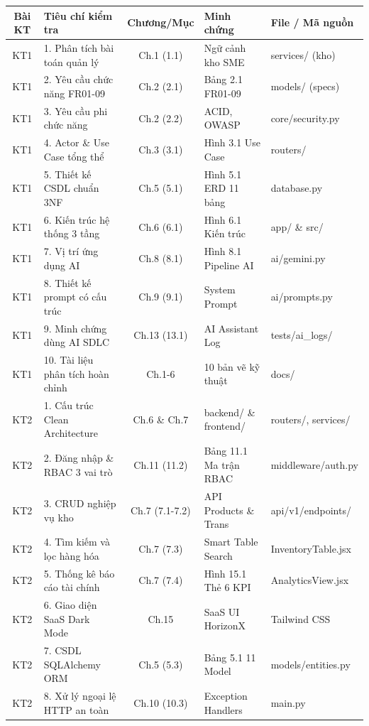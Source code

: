 \documentclass[12pt,a4paper,oneside]{report}
\begin{document}
\begin{table}[htbp]
\centering
\small
\begin{tabularx}{\textwidth}{|c|X|c|X|X|}
\hline
\textbf{Bài KT} & \textbf{Tiêu chí kiểm tra} & \textbf{Chương/Mục} & \textbf{Minh chứng} & \textbf{File / Mã nguồn} \\
\hline
KT1 & 1. Phân tích bài toán quản lý & Ch.1 (1.1) & Ngữ cảnh kho SME & services/ (kho) \\
KT1 & 2. Yêu cầu chức năng FR01-09 & Ch.2 (2.1) & Bảng 2.1 FR01-09 & models/ (specs) \\
KT1 & 3. Yêu cầu phi chức năng & Ch.2 (2.2) & ACID, OWASP & core/security.py \\
KT1 & 4. Actor \& Use Case tổng thể & Ch.3 (3.1) & Hình 3.1 Use Case & routers/ \\
KT1 & 5. Thiết kế CSDL chuẩn 3NF & Ch.5 (5.1) & Hình 5.1 ERD 11 bảng & database.py \\
KT1 & 6. Kiến trúc hệ thống 3 tầng & Ch.6 (6.1) & Hình 6.1 Kiến trúc & app/ \& src/ \\
KT1 & 7. Vị trí ứng dụng AI & Ch.8 (8.1) & Hình 8.1 Pipeline AI & ai/gemini.py \\
KT1 & 8. Thiết kế prompt có cấu trúc & Ch.9 (9.1) & System Prompt & ai/prompts.py \\
KT1 & 9. Minh chứng dùng AI SDLC & Ch.13 (13.1)& AI Assistant Log & tests/ai\_logs/ \\
KT1 & 10. Tài liệu phân tích hoàn chỉnh & Ch.1-6 & 10 bản vẽ kỹ thuật & docs/ \\
\hline
KT2 & 1. Cấu trúc Clean Architecture & Ch.6 \& Ch.7 & backend/ \& frontend/ & routers/, services/ \\
KT2 & 2. Đăng nhập \& RBAC 3 vai trò & Ch.11 (11.2) & Bảng 11.1 Ma trận RBAC & middleware/auth.py \\
KT2 & 3. CRUD nghiệp vụ kho & Ch.7 (7.1-7.2)& API Products \& Trans & api/v1/endpoints/ \\
KT2 & 4. Tìm kiếm và lọc hàng hóa & Ch.7 (7.3) & Smart Table Search & InventoryTable.jsx \\
KT2 & 5. Thống kê báo cáo tài chính & Ch.7 (7.4) & Hình 15.1 Thẻ 6 KPI & AnalyticsView.jsx \\
KT2 & 6. Giao diện SaaS Dark Mode & Ch.15 & SaaS UI HorizonX & Tailwind CSS \\
KT2 & 7. CSDL SQLAlchemy ORM & Ch.5 (5.3) & Bảng 5.1 11 Model & models/entities.py \\
KT2 & 8. Xử lý ngoại lệ HTTP an toàn & Ch.10 (10.3) & Exception Handlers & main.py \\

\end{tabularx}
\end{table}
\end{document}
